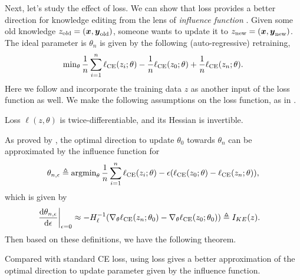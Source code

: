 Next, let's study the effect of {\NAME} loss. 
We can show that {\NAME} loss provides a better direction for knowledge editing from the lens of \textit{influence function} \citep{koh2017understanding}. 
Given some old knowledge $z_{\text{old}} = (\boldsymbol{x}, \boldsymbol{y}_{\text{old}})$, someone wants to update it to $z_{\text{new}} = (\boldsymbol{x}, \boldsymbol{y}_{\text{new}})$. 
The ideal parameter is $\theta_n$ is given by the following (auto-regressive) retraining, 
\begin{align*}
\min\nolimits_\theta \frac{1}{n} \sum_{i=1}^n \ell_{\text{CE}} (z_i; \theta) - \frac{1}{n} \ell_{\text{CE}} (z_0; \theta) + \frac{1}{n}\ell_{\text{CE}} (z_n; \theta).
\end{align*}
Here we follow \citet{} and incorporate the training data $z$ as another input of the loss function as well.  
We make the following assumptions on the loss function, as in \citep{koh2017understanding}.
% 
\begin{assumption}
Loss $\ell(z, \theta)$ is twice-differentiable, and its Hessian is invertible. 
\end{assumption}
% 

As proved by \citet{},
the optimal direction to update $\theta_0$ towards $\theta_n$ can be approximated by the influence function for
\begin{align*}
\theta_{n, \epsilon} \triangleq \operatorname{argmin}\nolimits_\theta \frac{1}{n} \sum_{i=1}^n \ell_{\text{CE}} (z_i; \theta) - \epsilon (\ell_{\text{CE}} (z_0; \theta) - \ell_{\text{CE}} (z_n; \theta)),
\end{align*}
which is given by 
\begin{align*}
\left. \frac{\mathop{}\!\mathrm{d} \theta_{n, \epsilon}}{ \mathop{}\!\mathrm{d} \epsilon} \right|_{\epsilon = 0} 
&\approx 
- H^{-1}_\ell (\nabla_\theta \ell_{\text{CE}} (z_n; \theta_0) - \nabla_\theta \ell_{\text{CE}} (z_0; \theta_0))
\triangleq I_{KE}(z).
\end{align*}
% 
Then based on these definitions, 
we have the following theorem.
\begin{theorem}
\label{thm:opt-direct}
Compared with standard CE loss, using {\NAME} loss gives a better approximation of the optimal direction to update parameter given by the influence function. 
\end{theorem}

